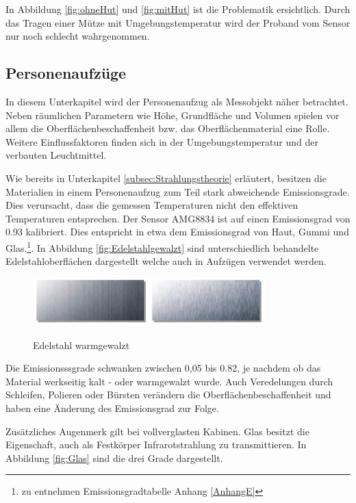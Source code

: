 In Abbildung \ref{fig:ohneHut} und \ref{fig:mitHut} ist die Problematik ersichtlich. Durch das Tragen einer Mütze mit Umgebungstemperatur wird der Proband vom Sensor nur noch schlecht wahrgenommen.

\subsection{Personenaufzüge}
\label{subsec:Personenaufzuege}
In diesem Unterkapitel wird der Personenaufzug als Messobjekt näher betrachtet. Neben räumlichen Parametern wie Höhe, Grundfläche und Volumen spielen vor allem die Oberflächenbeschaffenheit bzw. das Oberflächenmaterial eine Rolle. Weitere Einflussfaktoren finden sich in der Umgebungstemperatur und der verbauten Leuchtmittel.

Wie bereits in Unterkapitel \ref{subsec:Strahlungstheorie} erläutert, besitzen die Materialien in einem Personenaufzug zum Teil stark abweichende Emissionsgrade. Dies verursacht, dass die gemessen Temperaturen nicht den effektiven Temperaturen entsprechen. Der Sensor AMG8834 ist auf einen Emissionsgrad von 0.93 kalibriert. Dies entspricht in etwa dem Emissionsgrad von Haut, Gummi und Glas.\footnote[8]{ zu entnehmen Emissionsgradtabelle Anhang \ref{AnhangE}}.
In Abbildung \ref{fig:Edelstahlgewalzt} sind unterschiedlich behandelte Edelstahloberflächen dargestellt welche auch in Aufzügen verwendet werden.  
\begin{figure}[H]
	\centering
	\includegraphics[width=0.8\textwidth]
	{fig/Edelstahl_matt.PNG}
	\caption[Edelstahl warmgewalzt]{Edelstahl warmgewalzt} \protect\cite{Edelstahl}
	\label{fig:Edelstahl}
\end{figure}

Die Emissionsssgrade schwanken zwischen 0,05 bis 0.82, je nachdem ob das Material werkseitig kalt - oder warmgewalzt wurde. Auch Veredelungen durch Schleifen, Polieren oder Bürsten verändern die Oberflächenbeschaffenheit und haben eine Änderung des Emissionsgrad zur Folge. 

Zusätzliches Augenmerk gilt bei vollverglasten Kabinen. Glas besitzt die Eigenschaft, auch als Festkörper Infrarotstrahlung zu transmittieren. In Abbildung \ref{fig:Glas} sind die drei Grade dargestellt. 

